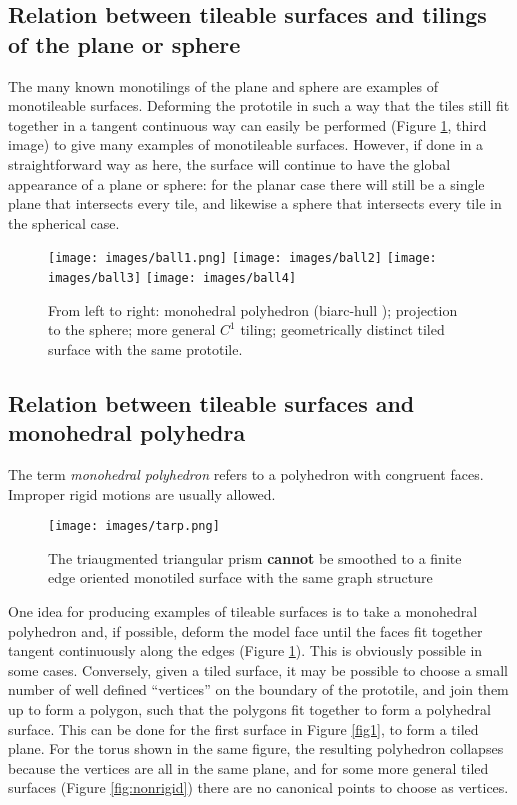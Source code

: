 \documentclass[11pt]{amsart}
\theoremstyle{remark}
\newcounter{case}
\begin{document}
 
 \subsection{Relation between tileable surfaces and tilings of the plane or sphere}
The many known monotilings of the plane and sphere are examples of monotileable surfaces.
 Deforming the prototile in such a way that the tiles still fit together in a tangent continuous 
 way can easily be performed (Figure \ref{fig2}, third image) to give many examples of monotileable surfaces. However,
 if done in a straightforward way as here, the surface will continue to have the global appearance of a plane or sphere: for the planar case there will still be a single plane that intersects every tile, and likewise a sphere that intersects every tile in the spherical case.
 \begin{figure}[h!tbp]
	\begin{center}
	\texttt{[image: images/ball1.png]}    \quad  
				\texttt{[image: images/ball2]}  	 \quad  
  \texttt{[image: images/ball3]}  	\quad
    \texttt{[image: images/ball4]}  												
		\end{center}
	\caption{From left to right: monohedral polyhedron (biarc-hull \cite{eppstein2021polyhedral});  projection to the sphere; more general $C^1$ tiling; geometrically distinct tiled surface with the same prototile.}
	\label{fig2}
\end{figure}


\subsection{Relation between tileable surfaces and monohedral polyhedra}
The term \emph{monohedral polyhedron} refers to a polyhedron with congruent faces.  Improper rigid motions are usually allowed. 


 \begin{figure}[h!tbp]
	\begin{center}
	\texttt{[image: images/tarp.png]}   				
		\end{center}
	\caption{The triaugmented triangular prism 
	 \textbf{cannot} be smoothed to a finite edge oriented monotiled surface with the same graph structure}
	\label{fig3}
\end{figure}


One idea for producing examples of tileable surfaces is to take a monohedral polyhedron and, if possible, deform the model face until the faces fit together tangent continuously along the edges (Figure \ref{fig2}). This is obviously possible in some cases.  Conversely, given a tiled surface, it may be possible to choose a small number of well defined ``vertices'' on the boundary of the prototile, and join them up to form a polygon, such that the polygons fit together to form a polyhedral surface. This can be done for the first surface in Figure \ref{fig1}, to form a tiled plane.   For the torus shown in the same figure, the resulting polyhedron collapses because the vertices are
all in the same plane, and for some more general tiled surfaces (Figure \ref{fig:nonrigid}) 
there are no canonical points to choose as vertices.
\end{document}
